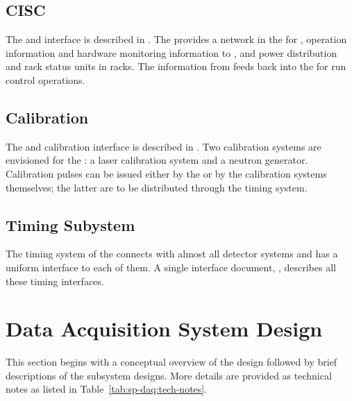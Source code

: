 \subsection{CISC}

\label{sec:sp-daq:interfaces-cisc}
The  and  interface is described in
. The  provides a network in the  for ,  operation information and hardware
monitoring information to , and power distribution and
rack status units in  racks. The information from 
feeds back into the  for run control operations.

\subsection{Calibration}

The  and calibration interface is described in
. Two calibration systems are envisioned for the
: a laser calibration system and a neutron
generator. Calibration pulses can be issued either by the  or by
the calibration systems themselves;  %
the latter are to be distributed through the
 timing system.


\subsection{Timing Subystem}

The timing system of the   connects with
almost all detector systems and has a uniform interface to each of
them. %
A single interface document,
, describes all these timing interfaces. 



\section{Data Acquisition System Design}
\label{sec:fd-daq:design}


This section %
begins with a conceptual overview of the  design followed by %
brief descriptions of the subsystem designs. 
More details are provided as technical notes as listed in Table~\ref{tab:sp-daq:tech-notes}.

